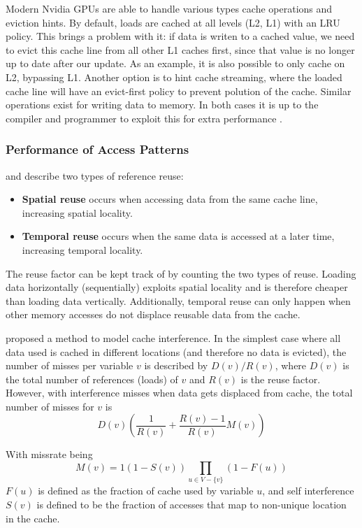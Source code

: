 \documentclass{article}
\begin{document}
Modern Nvidia GPUs are able to handle various types cache operations and eviction hints.
By default, loads are cached at all levels (L2, L1) with an LRU policy.
This brings a problem with it: if data is writen to a cached value, we need to evict this cache line from all other L1 caches first, since that value is no longer up to date after our update.
As an example, it is also possible to only cache on L2, bypassing L1.
Another option is to hint cache streaming, where the loaded cache line will have an evict-first policy to prevent polution of the cache.
Similar operations exist for writing data to memory.
In both cases it is up to the compiler and programmer to exploit this for extra performance \cite{nvidia2021cudadocs}.

\subsubsection{Performance of Access Patterns}
\citeauthor{lam1991cache} and \citeauthor{meyer2003algorithms} describe two types of reference reuse\cite{lam1991cache, meyer2003algorithms}:
\begin{itemize}
    \item \textbf{Spatial reuse} occurs when accessing data from the same cache line, increasing spatial locality.
    \item \textbf{Temporal reuse} occurs when the same data is accessed at a later time, increasing temporal locality.
\end{itemize}
The reuse factor can be kept track of by counting the two types of reuse.
Loading data horizontally (sequentially) exploits spatial locality and is therefore cheaper than loading data vertically.
Additionally, temporal reuse can only happen when other memory accesses do not displace reusable data from the cache.

\citeauthor{lam1991cache} proposed a method to model cache interference.
In the simplest case where all data used is cached in different locations (and therefore no data is evicted), the number of misses per variable $v$ is described by $D(v)/R(v)$, where $D(v)$ is the total number of references (loads) of $v$ and $R(v)$ is the reuse factor.
However, with interference misses when data gets displaced from cache, the total number of misses for $v$ is
\[
    D(v)\left(\frac{1}{R(v)}+\frac{R(v)-1}{R(v)}M(v)\right)
\]

With missrate being
\[
    M(v) = 1 \left(1 - S(v)\right) \prod_{u\in V - \{v\}}\left(1 - F(u)\right)
\]
$F(u)$ is defined as the fraction of cache used by variable $u$, and self interference $S(v)$ is defined to be the fraction of accesses that map to non-unique location in the cache.
\end{document}

